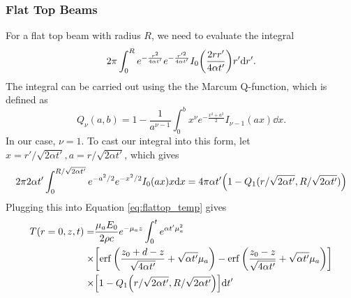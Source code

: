 \documentclass[]{article}
\begin{document}
\subsubsection{Flat Top Beams}
For a flat top beam with radius $R$, we need to evaluate the integral
\begin{equation*}
  2\pi \int_0^R  e^{-\frac{r^2}{4\alpha t'}}e^{-\frac{r'^2}{4\alpha t'}}I_0\qty(\frac{2rr'}{4\alpha t'}) r'\dd r'.
\end{equation*}
The integral can be carried out using the the Marcum Q-function, which is defined as
\begin{equation*}
Q_\nu(a,b) = 1 - \frac{1}{a^{\nu-1}}\int_0^b x^\nu e^{-\frac{x^2 + a^2}{2}} I_{\nu-1}(ax) \dd x.
\end{equation*}
In our case, $\nu=1$.
To cast our integral into this form, let $x = r'/\sqrt{2\alpha t'}, a = r/\sqrt{2\alpha t'}$, which gives
\begin{equation*}
  2\pi 2\alpha t' \int_0^{R/\sqrt{2\alpha t'}} e^{-a^2/2}e^{-x^2/2}I_0\qty(ax) x\dd x= 4\pi\alpha t' \qty(1 - Q_1(r/\sqrt{2\alpha t'},R/\sqrt{2\alpha t'}))
\end{equation*}
Plugging this into Equation \ref{eq:flattop_temp} gives
\begin{align}
  \label{eq:flattop_off_axis_temp}
  T(r=0, z,t) =& \frac{\mu_aE_0}{2\rho c}e^{-\mu_a z} \int_0^t e^{\alpha t'\mu_a^2}  \nonumber \\
  \times & \qty[\erf\qty(\frac{z_0 + d - z}{\sqrt{4\alpha t'}} + \sqrt{\alpha t'}\mu_a ) - \erf\qty(\frac{z_0 - z}{\sqrt{4\alpha t'}} + \sqrt{\alpha t'}\mu_a ) ] \nonumber \\
  \times & \qty[1 - Q_1\qty(r/\sqrt{2\alpha t'},R/\sqrt{2\alpha t'}) ]
  \dd t'
\end{align}
\end{document}

